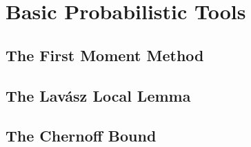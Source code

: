 \section{Basic Probabilistic Tools}
\subsection{The First Moment Method}
\subsection{The Lav\'asz Local Lemma}
\subsection{The Chernoff Bound}